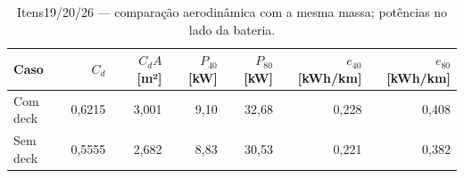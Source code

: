 \begin{table}[H]\centering\small
\caption{Itens19/20/26 — comparação aerodinâmica com a mesma massa; potências no lado da bateria.}\label{tab:deck}
\begin{tabularx}{\linewidth}{Xrrrrrr}
\toprule
Caso & $C_d$ & $C_dA$ [m²] & $P_{40}$ [kW] & $P_{80}$ [kW] & $e_{40}$ [kWh/km] & $e_{80}$ [kWh/km] \\
\midrule
Com deck & 0,6215 & 3,001 & 9,10 & 32,68 & 0,228 & 0,408 \\
Sem deck & 0,5555 & 2,682 & 8,83 & 30,53 & 0,221 & 0,382 \\
\bottomrule
\end{tabularx}
\end{table}
